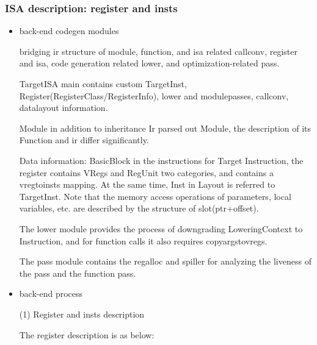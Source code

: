 \subsubsection{ISA description: register and insts}

\begin{itemize}
    \item back-end codegen modules

bridging ir structure of module, function, and isa related callconv, register and isa, code generation related lower, and optimization-related pass.

TargetISA main contains custom TargetInst, Register(RegisterClass/RegisterInfo), lower and modulepasses, callconv, datalayout information.

Module in addition to inheritance Ir parsed out Module, the description of its Function and ir differ significantly.

Data information: BasicBlock in the instructions for Target Instruction, the register contains VRegs and RegUnit two categories, and contains a vregtoinsts mapping.
At the same time, Inst in Layout is referred to TargetInst. Note that the memory access operations of parameters, local variables, etc. are described by the structure of slot(ptr+offset).

The lower module provides the process of downgrading LoweringContext to Instruction, and for function calls it also requires copyargstovregs.

The pass module contains the regalloc and spiller for analyzing the liveness of the pass and the function pass.

        \item back-end process

(1) Register and insts description

The register description is as below:
\begin{table}[!ht]
    \caption{Register Description}
    \label{table:register-description}
\end{table}


\end{itemize}
